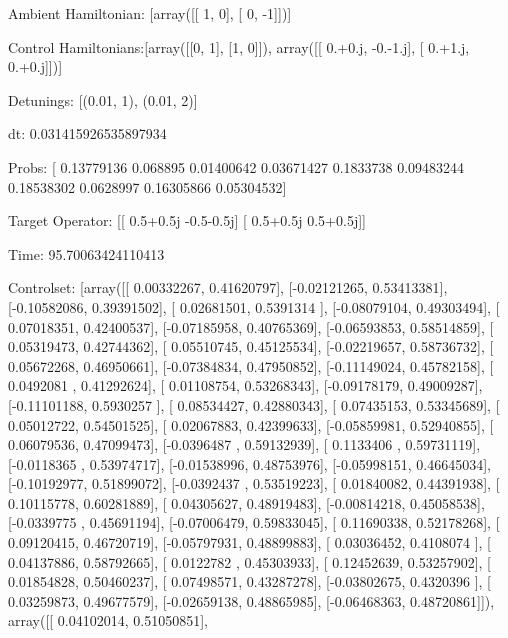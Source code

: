 \documentclass{article}
\begin{document}
    

\newpage

Ambient Hamiltonian: [array([[ 1,  0],
       [ 0, -1]])]

Control Hamiltonians:[array([[0, 1],
       [1, 0]]), array([[ 0.+0.j, -0.-1.j],
       [ 0.+1.j,  0.+0.j]])]

Detunings: [(0.01, 1), (0.01, 2)]

 dt: 0.031415926535897934

Probs: [ 0.13779136  0.068895    0.01400642  0.03671427  0.1833738   0.09483244
  0.18538302  0.0628997   0.16305866  0.05304532]

Target Operator: [[ 0.5+0.5j -0.5-0.5j]
 [ 0.5+0.5j  0.5+0.5j]]

Time: 95.70063424110413

Controlset: [array([[ 0.00332267,  0.41620797],
       [-0.02121265,  0.53413381],
       [-0.10582086,  0.39391502],
       [ 0.02681501,  0.5391314 ],
       [-0.08079104,  0.49303494],
       [ 0.07018351,  0.42400537],
       [-0.07185958,  0.40765369],
       [-0.06593853,  0.58514859],
       [ 0.05319473,  0.42744362],
       [ 0.05510745,  0.45125534],
       [-0.02219657,  0.58736732],
       [ 0.05672268,  0.46950661],
       [-0.07384834,  0.47950852],
       [-0.11149024,  0.45782158],
       [ 0.0492081 ,  0.41292624],
       [ 0.01108754,  0.53268343],
       [-0.09178179,  0.49009287],
       [-0.11101188,  0.5930257 ],
       [ 0.08534427,  0.42880343],
       [ 0.07435153,  0.53345689],
       [ 0.05012722,  0.54501525],
       [ 0.02067883,  0.42399633],
       [-0.05859981,  0.52940855],
       [ 0.06079536,  0.47099473],
       [-0.0396487 ,  0.59132939],
       [ 0.1133406 ,  0.59731119],
       [-0.0118365 ,  0.53974717],
       [-0.01538996,  0.48753976],
       [-0.05998151,  0.46645034],
       [-0.10192977,  0.51899072],
       [-0.0392437 ,  0.53519223],
       [ 0.01840082,  0.44391938],
       [ 0.10115778,  0.60281889],
       [ 0.04305627,  0.48919483],
       [-0.00814218,  0.45058538],
       [-0.0339775 ,  0.45691194],
       [-0.07006479,  0.59833045],
       [ 0.11690338,  0.52178268],
       [ 0.09120415,  0.46720719],
       [-0.05797931,  0.48899883],
       [ 0.03036452,  0.4108074 ],
       [ 0.04137886,  0.58792665],
       [ 0.0122782 ,  0.45303933],
       [ 0.12452639,  0.53257902],
       [ 0.01854828,  0.50460237],
       [ 0.07498571,  0.43287278],
       [-0.03802675,  0.4320396 ],
       [ 0.03259873,  0.49677579],
       [-0.02659138,  0.48865985],
       [-0.06468363,  0.48720861]]), array([[ 0.04102014,  0.51050851],
\end{document}
